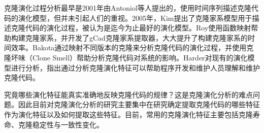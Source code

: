 克隆演化过程分析最早是2001年由Antoniol等人提出的，使用时间序列描述克隆代码的演化模型\cite{antoniol2001modeling}，但并未引起人们的重视。2005年，Kim提出了克隆家系模型用于描述克隆代码的演化过程，被认为是迄今为止最好的演化模型\cite{kim2005empirical}。Roy使用函数映射帮助构建克隆家系，并开发了gCad克隆家系提取器，大大提升了构建克隆家系的时间效率\cite{saha2011automatic}。Bakota通过映射不同版本的克隆来分析克隆代码的演化过程，并使用克隆坏味（Clone Smell）帮助分析克隆代码对系统的影响\cite{bakota2011tracking}。Harder对现有的演化模型进行分析\cite{harder2009modeling}，指出通过分析克隆演化特征可以帮助程序开发和维护人员理解和维护克隆代码。

究竟哪些演化特征能真实准确地反映克隆代码的规律？这是克隆演化分析的难点问题。因此目前对克隆演化分析的研究主要集中在研究确定提取克隆代码的哪些特征作为演化特征以及如何提取这些特征。目前，常用的克隆演化特征主要包括克隆寿命、克隆稳定性与一致性变化。




